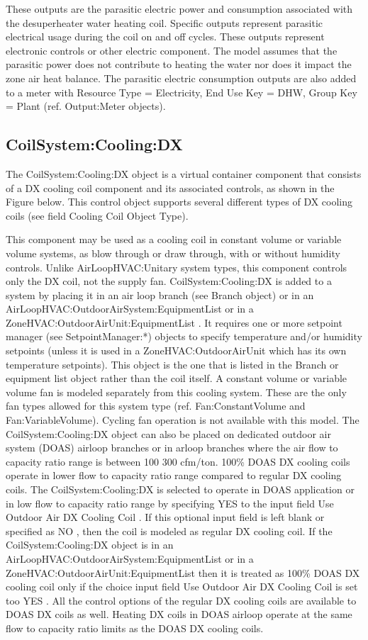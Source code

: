 These outputs are the parasitic electric power and consumption associated with the desuperheater water heating coil. Specific outputs represent parasitic electrical usage during the coil on and off cycles. These outputs represent electronic controls or other electric component. The model assumes that the parasitic power does not contribute to heating the water nor does it impact the zone air heat balance. The parasitic electric consumption outputs are also added to a meter with Resource Type = Electricity, End Use Key = DHW, Group Key = Plant (ref. Output:Meter objects).

\subsection{CoilSystem:Cooling:DX}\label{coilsystemcoolingdx}

The CoilSystem:Cooling:DX object is a virtual container component that consists of a DX cooling coil component and its associated controls, as shown in the Figure below. This control object supports several different types of DX cooling coils (see field Cooling Coil Object Type).

This component may be used as a cooling coil in constant volume or variable volume systems, as blow through or draw through, with or without humidity controls. Unlike AirLoopHVAC:Unitary system types, this component controls only the DX coil, not the supply fan. CoilSystem:Cooling:DX is added to a system by placing it in an air loop branch (see Branch object) or in an AirLoopHVAC:OutdoorAirSystem:EquipmentList or in a ZoneHVAC:OutdoorAirUnit:EquipmentList . It requires one or more setpoint manager (see SetpointManager:*) objects to specify temperature and/or humidity setpoints (unless it is used in a ZoneHVAC:OutdoorAirUnit which has its own temperature setpoints). This object is the one that is listed in the Branch or equipment list object rather than the coil itself. A constant volume or variable volume fan is modeled separately from this cooling system. These are the only fan types allowed for this system type (ref. Fan:ConstantVolume and Fan:VariableVolume). Cycling fan operation is not available with this model. The CoilSystem:Cooling:DX object can also be placed on dedicated outdoor air system (DOAS) airloop branches or in arloop branches where the air flow to capacity ratio range is between 100 300 cfm/ton. 100\% DOAS DX cooling coils operate in lower flow to capacity ratio range compared to regular DX cooling coils. The CoilSystem:Cooling:DX is selected to operate in DOAS application or in low flow to capacity ratio range by specifying YES to the input field Use Outdoor Air DX Cooling Coil . If this optional input field is left blank or specified as NO , then the coil is modeled as regular DX cooling coil. If the CoilSystem:Cooling:DX object is in an AirLoopHVAC:OutdoorAirSystem:EquipmentList or in a ZoneHVAC:OutdoorAirUnit:EquipmentList then it is treated as 100\% DOAS DX cooling coil only if the choice input field Use Outdoor Air DX Cooling Coil is set too YES . All the control options of the regular DX cooling coils are available to DOAS DX coils as well. Heating DX coils in DOAS airloop operate at the same flow to capacity ratio limits as the DOAS DX cooling coils.

